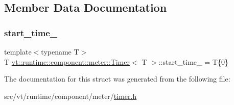 \subsection{Member Data Documentation}
\mbox{\label{structvt_1_1runtime_1_1component_1_1meter_1_1_timer_a097137934875f01d9e9ed8653916df64}} 
\subsubsection{\texorpdfstring{start\+\_\+time\+\_\+}{start\_time\_}}
{\footnotesize\ttfamily template$<$typename T$>$ \\
T \hyperlink{structvt_1_1runtime_1_1component_1_1meter_1_1_timer}{vt\+::runtime\+::component\+::meter\+::\+Timer}$<$ T $>$\+::start\+\_\+time\+\_\+ = T\{0\}\hspace{0.3cm}{\ttfamily [private]}}



The documentation for this struct was generated from the following file\+:\begin{DoxyCompactItemize}
\item 
src/vt/runtime/component/meter/\hyperlink{timer_8h}{timer.\+h}\end{DoxyCompactItemize}
